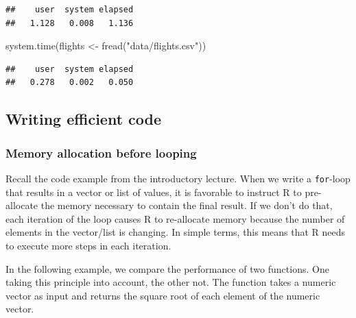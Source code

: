 \documentclass[
  12pt,
]{style/krantz}
\newenvironment{Shaded}{\begin{snugshade}}{\end{snugshade}}
\newcommand{\FunctionTok}[1]{\textcolor[rgb]{0.00,0.00,0.00}{#1}}
\newcommand{\NormalTok}[1]{#1}
\newcommand{\OtherTok}[1]{\textcolor[rgb]{0.56,0.35,0.01}{#1}}
\newcommand{\StringTok}[1]{\textcolor[rgb]{0.31,0.60,0.02}{#1}}
\begin{document}
\begin{verbatim}
##    user  system elapsed 
##   1.128   0.008   1.136
\end{verbatim}

\begin{Shaded}
\begin{Highlighting}[]
\FunctionTok{system.time}\NormalTok{(flights }\OtherTok{\textless{}{-}} \FunctionTok{fread}\NormalTok{(}\StringTok{"data/flights.csv"}\NormalTok{))}
\end{Highlighting}
\end{Shaded}

\begin{verbatim}
##    user  system elapsed 
##   0.278   0.002   0.050
\end{verbatim}

\hypertarget{writing-efficient-code}{%
\subsection{Writing efficient code}\label{writing-efficient-code}}

\hypertarget{memory-allocation-before-looping}{%
\subsubsection{Memory allocation before looping}\label{memory-allocation-before-looping}}

Recall the code example from the introductory lecture. When we write a \texttt{for}-loop that results in a vector or list of values, it is favorable to instruct R to pre-allocate the memory necessary to contain the final result. If we don't do that, each iteration of the loop causes R to re-allocate memory because the number of elements in the vector/list is changing. In simple terms, this means that R needs to execute more steps in each iteration.

In the following example, we compare the performance of two functions. One taking this principle into account, the other not. The function takes a numeric vector as input and returns the square root of each element of the numeric vector.
\end{document}
